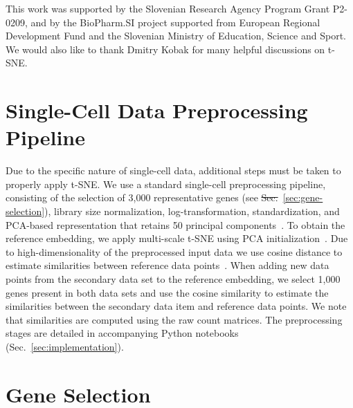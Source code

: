 \documentclass[runningheads]{llncs}
\newcommand{\beginsupplement}{%
  \setcounter{table}{0} %
  \renewcommand{\thetable}{S\arabic{table}}%
  \setcounter{figure}{0} %
  \renewcommand{\thefigure}{S\arabic{figure}}%
} %
\providecommand{\DIFaddtex}[1]{{\protect\color{blue}\uwave{#1}}} %
\providecommand{\DIFdeltex}[1]{{\protect\color{red}\sout{#1}}}                      %
\providecommand{\DIFaddbegin}{} %
\providecommand{\DIFaddend}{} %
\providecommand{\DIFdelbegin}{} %
\providecommand{\DIFdelend}{} %
\providecommand{\DIFadd}[1]{\texorpdfstring{\DIFaddtex{#1}}{#1}} %
\providecommand{\DIFdel}[1]{\texorpdfstring{\DIFdeltex{#1}}{}} %
\newcommand{\DIFscaledelfig}{0.5}
\newlength{\DIFdelgraphicswidth} %
\newlength{\DIFdelgraphicsheight} %
\newcommand{\DIFaddincludegraphics}[2][]{{\color{blue}\fbox{\DIFOincludegraphics[#1]{#2}}}} %
\newcommand{\DIFdelincludegraphics}[2][]{%
\sbox{\DIFdelgraphicsbox}{\DIFOincludegraphics[#1]{#2}}%
\settoboxwidth{\DIFdelgraphicswidth}{\DIFdelgraphicsbox} %
\settoboxtotalheight{\DIFdelgraphicsheight}{\DIFdelgraphicsbox} %
\scalebox{\DIFscaledelfig}{%
\parbox[b]{\DIFdelgraphicswidth}{\usebox{\DIFdelgraphicsbox}\\[-\baselineskip] \rule{\DIFdelgraphicswidth}{0em}}\llap{\resizebox{\DIFdelgraphicswidth}{\DIFdelgraphicsheight}{%
\setlength{\unitlength}{\DIFdelgraphicswidth}%
\begin{picture}(1,1)%
\thicklines\linethickness{2pt} %
{\color[rgb]{1,0,0}\put(0,0){\framebox(1,1){}}}%
{\color[rgb]{1,0,0}\put(0,0){\line( 1,1){1}}}%
{\color[rgb]{1,0,0}\put(0,1){\line(1,-1){1}}}%
\end{picture}%
}\hspace*{3pt}}} %
} %
\DeclareRobustCommand{\DIFaddbegin}{\DIFOaddbegin \let\includegraphics\DIFaddincludegraphics} %
\DeclareRobustCommand{\DIFaddend}{\DIFOaddend \let\includegraphics\DIFOincludegraphics} %
\DeclareRobustCommand{\DIFdelbegin}{\DIFOdelbegin \let\includegraphics\DIFdelincludegraphics} %
\DeclareRobustCommand{\DIFdelend}{\DIFOaddend \let\includegraphics\DIFOincludegraphics} %
\begin{document}
This work was supported by the Slovenian Research Agen\-cy Program Grant P2-0209,
and by the BioPharm.SI project supported from European Regional Development
Fund and the Slovenian Ministry of Education, Science and Sport. We would also
like to thank Dmitry Kobak for many helpful discussions on t-SNE.

% 



\DIFaddbegin \newpage
\DIFaddend \appendix
\DIFaddbegin \beginsupplement
\DIFaddend 

\section{Single-Cell Data Preprocessing Pipeline\label{sec:sc-pipeline}}

Due to the specific nature of single-cell data, additional steps must be taken
to properly apply t-SNE. We use a standard single-cell preprocessing
pipeline, consisting of the selection of 3,000 representative genes
(see \DIFdelbegin \DIFdel{Sec.}\DIFdelend \DIFaddbegin \DIFadd{Appendix}\DIFaddend ~\ref{sec:gene-selection}), library size normalization,
log-transformation, standardization, and PCA-based representation that
retains 50 principal components~\cite{Stuart2019,Wolf2018}. To obtain the
reference embedding, we apply multi-scale t-SNE using PCA
initialization~\cite{Kobak2019}. Due to high-dimensionality of the
preprocessed input data we use cosine distance to estimate similarities
between reference data points~\cite{Domingos2012}. When adding new data
points from the secondary data set to the reference embedding, we select
1,000 genes present in both data sets and use the cosine similarity to
estimate the similarities between the secondary data item and reference data
points. We note that similarities are computed using the raw count matrices.
The preprocessing stages are detailed in accompanying Python notebooks
(Sec.~\ref{sec:implementation}).

\section{Gene Selection\label{sec:gene-selection}}

\DIFdelbegin %
\end{document}
